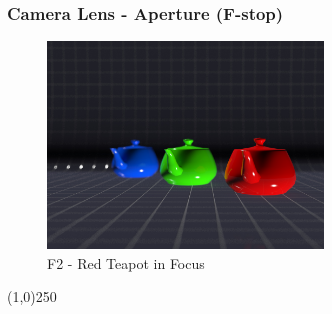 \begin{frame}
\frametitle{Camera Lens - Aperture (F-stop)}
\begin{figure}
	\centering
	\includegraphics[height=5.5cm]{img/Cameras/RedTeapot.jpg}
	\caption[F2 - Red Teapot in Focus]{F2 - Red Teapot in Focus}
	\label{fig:BlueTeaPot}
\end{figure}
\end{frame}
\begin{center}\line(1,0){250}\end{center}







\newpage

%



%
%
\nocite{*}


\newpage

\printindex
\newpage






